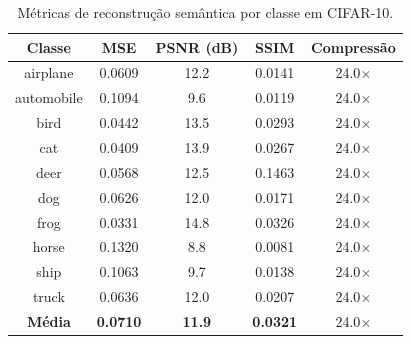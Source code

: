 \begin{table}[htbp]
\centering
\caption{Métricas de reconstrução semântica por classe em CIFAR-10.}
\label{tab:reconstruction}
\begin{tabular}{ccccc}
\hline
\textbf{Classe} & \textbf{MSE} & \textbf{PSNR (dB)} & \textbf{SSIM} & \textbf{Compressão} \\
\hline
airplane & 0.0609 & 12.2 & 0.0141 & 24.0$\times$ \\
automobile & 0.1094 & 9.6 & 0.0119 & 24.0$\times$ \\
bird & 0.0442 & 13.5 & 0.0293 & 24.0$\times$ \\
cat & 0.0409 & 13.9 & 0.0267 & 24.0$\times$ \\
deer & 0.0568 & 12.5 & 0.1463 & 24.0$\times$ \\
dog & 0.0626 & 12.0 & 0.0171 & 24.0$\times$ \\
frog & 0.0331 & 14.8 & 0.0326 & 24.0$\times$ \\
horse & 0.1320 & 8.8 & 0.0081 & 24.0$\times$ \\
ship & 0.1063 & 9.7 & 0.0138 & 24.0$\times$ \\
truck & 0.0636 & 12.0 & 0.0207 & 24.0$\times$ \\
\hline
\textbf{Média} & \textbf{0.0710} & \textbf{11.9} & \textbf{0.0321} & 24.0$\times$ \\
\hline
\end{tabular}
\end{table}
